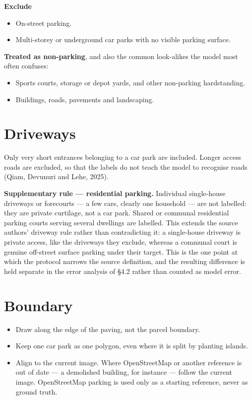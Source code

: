 \textbf{Exclude}

\begin{itemize}
\tightlist
\item
  On-street parking.
\item
  Multi-storey or underground car parks with no visible parking surface.
\end{itemize}

\textbf{Treated as non-parking}, and also the common look-alikes the model most often confuses:

\begin{itemize}
\tightlist
\item
  Sports courts, storage or depot yards, and other non-parking hardstanding.
\item
  Buildings, roads, pavements and landscaping.
\end{itemize}

\hypertarget{driveways}{%
\section{Driveways}\label{driveways}}

Only very short entrances belonging to a car park are included. Longer access roads are excluded, so that the labels do not teach the model to recognise roads (Qiam, Devunuri and Lehe, 2025).

\textbf{Supplementary rule --- residential parking.} Individual single-house driveways or forecourts --- a few cars, clearly one household --- are not labelled: they are private curtilage, not a car park. Shared or communal residential parking courts serving several dwellings are labelled. This extends the source authors' driveway rule rather than contradicting it: a single-house driveway is private access, like the driveways they exclude, whereas a communal court is genuine off-street surface parking under their target. This is the one point at which the protocol narrows the source definition, and the resulting difference is held separate in the error analysis of §4.2 rather than counted as model error.

\hypertarget{boundary}{%
\section{Boundary}\label{boundary}}

\begin{itemize}
\tightlist
\item
  Draw along the edge of the paving, not the parcel boundary.
\item
  Keep one car park as one polygon, even where it is split by planting islands.
\item
  Align to the current image. Where OpenStreetMap or another reference is out of date --- a demolished building, for instance --- follow the current image. OpenStreetMap parking is used only as a starting reference, never as ground truth.
\end{itemize}

